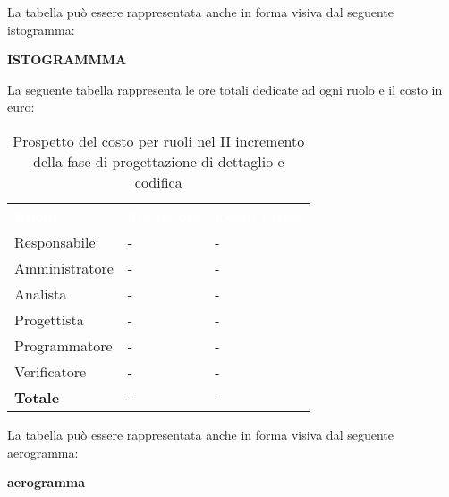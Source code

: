 La tabella può essere rappresentata anche in forma visiva dal seguente istogramma:

\textbf{ISTOGRAMMMA}


La seguente tabella rappresenta le ore totali dedicate ad ogni ruolo e il costo in euro:

\begin{table}[!htbp]
\begin{center}
\renewcommand{\arraystretch}{1.5}
\begin{tabular}{ m{}<{\centering}  m{}<{\centering} m{}<{\centering}}
	\rowcolor{darkblue}
	\textcolor{white}{\textbf{Ruolo}}&\textcolor{white}{\textbf{Totale ore}}&\textcolor{white}{\textbf{Costo totale}}\\ 

	Responsabile  & - & - \\	

	\rowcolor{gray!10} Amministratore & - & - \\
	
	Analista & - & - \\
	
	\rowcolor{gray!10} Progettista & - & - \\
	
	Programmatore & - & - \\
	
	\rowcolor{gray!10} Verificatore & - & - \\
	
	\textbf{Totale} & - & - \\
	
\end{tabular}
\caption{Prospetto del costo per ruoli nel II incremento della fase di progettazione di dettaglio e codifica}
\end{center}
\end{table}

La tabella può essere rappresentata anche in forma visiva dal seguente aerogramma:

\textbf{aerogramma}


